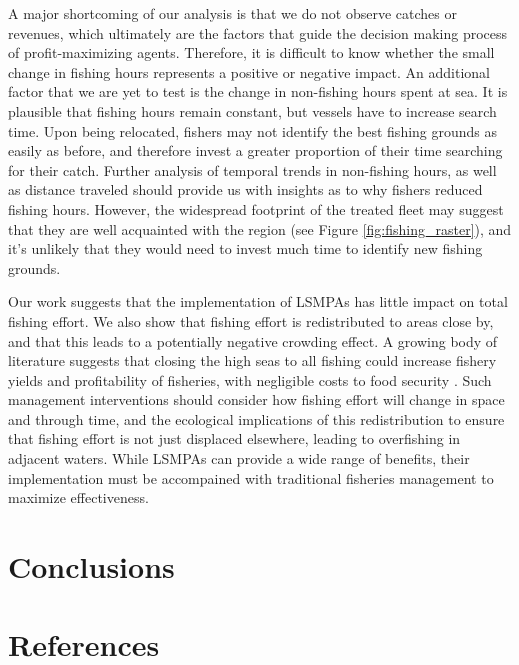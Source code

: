 \documentclass[9p,twocolumn,twoside,lineno]{pnas-new}
\begin{document}
A major shortcoming of our analysis is that we do not observe catches or revenues, which ultimately are the factors that guide the decision making process of profit-maximizing agents. Therefore, it is difficult to know whether the small change in fishing hours represents a positive or negative impact. An additional factor that we are yet to test is the change in non-fishing hours spent at sea. It is plausible that fishing hours remain constant, but vessels have to increase search time. Upon being relocated, fishers may not identify the best fishing grounds as easily as before, and therefore invest a greater proportion of their time searching for their catch. Further analysis of temporal trends in non-fishing hours, as well as distance traveled should provide us with insights as to why fishers reduced fishing hours. However, the widespread footprint of the treated fleet may suggest that they are well acquainted with the region (see Figure \ref{fig:fishing_raster}), and it's unlikely that they would need to invest much time to identify new fishing grounds.

Our work suggests that the implementation of LSMPAs has little impact on total fishing effort. We also show that fishing effort is redistributed to areas close by, and that this leads to a potentially negative crowding effect. A growing body of literature suggests that closing the high seas to all fishing could increase fishery yields and profitability of fisheries, with negligible costs to food security \citep{white_2014,sumaila_2015,sala_2018a,schiller_2018}. Such management interventions should consider how fishing effort will change in space and through time, and the ecological implications of this redistribution to ensure that fishing effort is not just displaced elsewhere, leading to overfishing in adjacent waters. While LSMPAs can provide a wide range of benefits, their implementation must be accompained with traditional fisheries management to maximize effectiveness.

\section{Conclusions}

\section{References}



\end{document}
